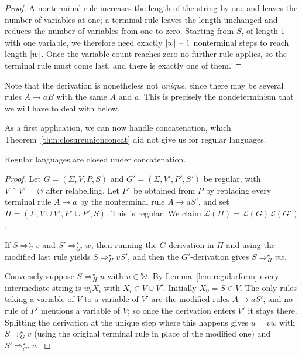 \documentclass[a4paper]{scrartcl}
\newcommand{\WW}{\mathbb{W}}
\newcommand{\lang}{\mathcal{L}}
\begin{document}
\begin{proof}
	A nonterminal rule increases the length of the string by one and leaves the number of variables at one; a terminal rule leaves the length unchanged and reduces the number of variables from one to zero. Starting from $S$, of length $1$ with one variable, we therefore need exactly $\lvert w\rvert - 1$ nonterminal steps to reach length $\lvert w\rvert$. Once the variable count reaches zero no further rule applies, so the terminal rule must come last, and there is exactly one of them.
\end{proof}

Note that the derivation is nonetheless not \emph{unique}, since there may be several rules $A \to aB$ with the same $A$ and $a$. This is precisely the nondeterminism that we will have to deal with below.

As a first application, we can now handle concatenation, which Theorem~\ref{thm:closureunionconcat} did not give us for regular languages.

\begin{lemma}\label{lem:regconcat}
	Regular languages are closed under concatenation.
\end{lemma}

\begin{proof}
	Let $G = (\Sigma, V, P, S)$ and $G' = (\Sigma, V', P', S')$ be regular, with $V \cap V' = \varnothing$ after relabelling. Let $P^\star$ be obtained from $P$ by replacing every terminal rule $A \to a$ by the nonterminal rule $A \to aS'$, and set $H = (\Sigma, V \cup V', P^\star \cup P', S)$. This is regular. We claim $\lang(H) = \lang(G)\lang(G')$.

	If $S \Rightarrow_G^\star v$ and $S' \Rightarrow_{G'}^\star w$, then running the $G$-derivation in $H$ and using the modified last rule yields $S \Rightarrow_H^\star vS'$, and then the $G'$-derivation gives $S \Rightarrow_H^\star vw$.

	Conversely suppose $S \Rightarrow_H^\star u$ with $u \in \WW$. By Lemma~\ref{lem:regularform} every intermediate string is $w_iX_i$ with $X_i \in V \cup V'$. Initially $X_0 = S \in V$. The only rules taking a variable of $V$ to a variable of $V'$ are the modified rules $A \to aS'$, and no rule of $P'$ mentions a variable of $V$; so once the derivation enters $V'$ it stays there. Splitting the derivation at the unique step where this happens gives $u = vw$ with $S \Rightarrow_G^\star v$ (using the original terminal rule in place of the modified one) and $S' \Rightarrow_{G'}^\star w$.
\end{proof}
\end{document}
